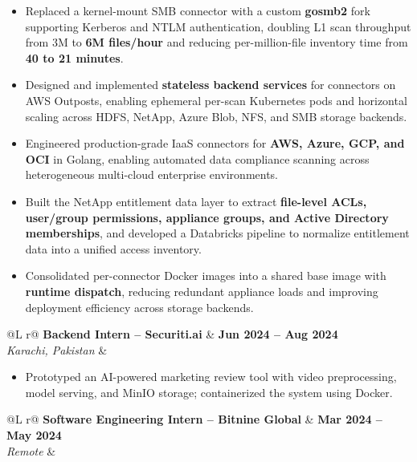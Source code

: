 \documentclass[a4paper,9pt]{article}
\begin{document}
\begin{itemize}
    \item Replaced a kernel-mount SMB connector with a custom \textbf{gosmb2} fork supporting Kerberos and NTLM authentication, doubling L1 scan throughput from 3M to \textbf{6M files/hour} and reducing per-million-file inventory time from \textbf{40 to 21 minutes}.

    \item Designed and implemented \textbf{stateless backend services} for connectors on AWS Outposts, enabling ephemeral per-scan Kubernetes pods and horizontal scaling across HDFS, NetApp, Azure Blob, NFS, and SMB storage backends.

    \item Engineered production-grade IaaS connectors for \textbf{AWS, Azure, GCP, and OCI} in Golang, enabling automated data compliance scanning across heterogeneous multi-cloud enterprise environments.

    \item Built the NetApp entitlement data layer to extract \textbf{file-level ACLs, user/group permissions, appliance groups, and Active Directory memberships}, and developed a Databricks pipeline to normalize entitlement data into a unified access inventory.

    \item Consolidated per-connector Docker images into a shared base image with \textbf{runtime dispatch}, reducing redundant appliance loads and improving deployment efficiency across storage backends.
\end{itemize}

\begin{tabularx}{\linewidth}{@{}L r@{}}
\textbf{Backend Intern -- Securiti.ai}
& \textbf{Jun 2024 -- Aug 2024} \\
\textit{Karachi, Pakistan}
&
\end{tabularx}

\begin{itemize}
    \item Prototyped an AI-powered marketing review tool with video preprocessing, model serving, and MinIO storage; containerized the system using Docker.
\end{itemize}

\begin{tabularx}{\linewidth}{@{}L r@{}}
\textbf{Software Engineering Intern -- Bitnine Global}
& \textbf{Mar 2024 -- May 2024} \\
\textit{Remote}
&
\end{tabularx}
\end{document}
